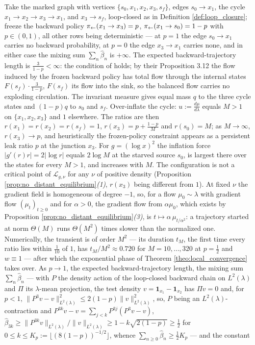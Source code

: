 \begin{remark}\label{rem:cycle_no_stalemate}
Take the marked graph with vertices $\{s_0,x_1,x_2,x_3,s_f\}$, edges $s_0\rightarrow x_1$, the cycle $x_1\rightarrow x_2\rightarrow x_3\rightarrow x_1$, and $x_3\rightarrow s_f$, loop-closed as in Definition \ref{def:loop_closure}; freeze the backward policy $\pi_{\leftarrow}(x_1\rightarrow x_3)=p$, $\pi_{\leftarrow}(x_1\rightarrow s_0)=1-p$ with $p\in(0,1)$, all other rows being deterministic --- at $p=1$ the edge $s_0\rightarrow x_1$ carries no backward probability, at $p=0$ the edge $x_3\rightarrow x_1$ carries none, and in either case the mixing sum $\sum_n\widehat\beta_n$ is $+\infty$. The expected backward-trajectory length is $\frac3{1-p}<\infty$: the condition of \citet{morozov2025revisiting} holds; by their Proposition 3.12 the flow induced by the frozen backward policy has total flow through the internal states $F(s_f)\cdot\frac3{1-p}$, $F(s_f)$ its flow into the sink, so the balanced flow carries no exploding circulation. The invariant measure gives equal mass $q$ to the three cycle states and $(1-p)q$ to $s_0$ and $s_f$. Over-inflate the cycle: $u:=\frac{d\mu}{d\lambda}$ equals $M>1$ on $\{x_1,x_2,x_3\}$ and $1$ elsewhere. The ratios are then $r(x_1)=r(x_2)=r(s_f)=1$, $r(x_3)=p+\frac{1-p}M$ and $r(s_0)=M$; as $M\rightarrow\infty$, $r(x_3)\rightarrow p$, and heuristically the frozen-policy constraint appears as a persistent leak ratio $p$ at the junction $x_3$. For $g=(\log x)^2$ the inflation force $|g'(r)r|=2|\log r|$ equals $2\log M$ at the starved source $s_0$, is largest there over the states for every $M>1$, and increases with $M$. The configuration is not a critical point of $\mathcal L_{g,\nu}$ for any $\nu$ of positive density (Proposition \ref{prop:no_distant_equilibrium}\emph{(1)}, $r(x_3)$ being different from $1$). At fixed $\nu$ the gradient field is homogeneous of degree $-1$, so, for a flow $\mu_0\sim\lambda$ with gradient flow $(\mu_t)_{t\geq0}$ and for $\alpha>0$, the gradient flow from $\alpha\mu_0$, which exists by Proposition \ref{prop:no_distant_equilibrium}\emph{(3)}, is $t\mapsto\alpha\,\mu_{t/\alpha^2}$: a trajectory started at norm $\Theta(M)$ runs $\Theta(M^2)$ times slower than the normalized one. Numerically, the transient is of order $M^2$ --- its duration $t_M$, the first time every ratio lies within $\frac1{10}$ of $1$, has $t_M/M^2\approx0.720$ for $M=10,\dots,320$ at $p=\frac12$ and $w\equiv1$ --- after which the exponential phase of Theorem \ref{theo:local_convergence} takes over. As $p\rightarrow1$, the expected backward-trajectory length, the mixing sum $\sum_n\widehat\beta_n$ --- with $P$ the density action of the loop-closed backward chain on $L^2(\lambda)$ and $\Pi$ its $\lambda$-mean projection, the test density $v=\mathbf 1_{x_1}-\mathbf 1_{x_2}$ has $\Pi v=0$ and, for $p<1$, $\|P^3v-v\|_{L^2(\lambda)}^2\leq2(1-p)\|v\|_{L^2(\lambda)}^2$, so, $P$ being an $L^2(\lambda)$-contraction and $P^{3k}v-v=\sum_{j<k}P^{3j}(P^3v-v)$, $\widehat\beta_{3k}\geq\|P^{3k}v\|_{L^2(\lambda)}/\|v\|_{L^2(\lambda)}\geq1-k\sqrt{2(1-p)}\geq\frac12$ for $0\leq k\leq K_p:=\lfloor(8(1-p))^{-1/2}\rfloor$, whence $\sum_{n\geq0}\widehat\beta_n\geq\frac12K_p$ --- and the constant 
\end{remark}
